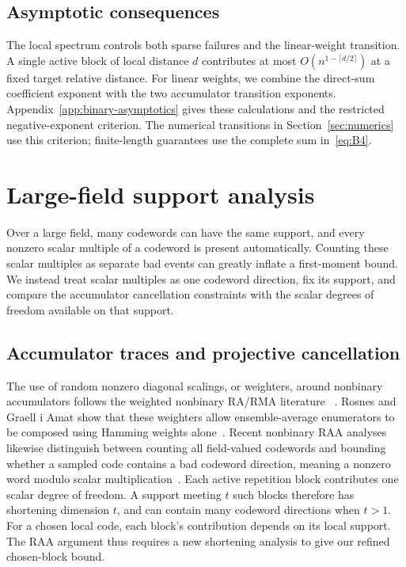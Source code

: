 \documentclass[runningheads,envcountsame,envcountsect]{llncs}
\begin{document}
\subsection{Asymptotic consequences}
The local spectrum controls both sparse failures and the linear-weight
transition.  A single active block of local distance $d$ contributes at most
$O(n^{1-\lceil d/2\rceil})$ at a fixed target relative distance.  For linear
weights, we combine the direct-sum coefficient exponent with the two
accumulator transition exponents.  Appendix~\ref{app:binary-asymptotics}
gives these calculations and the restricted negative-exponent criterion.
The numerical transitions in Section~\ref{sec:numerics} use this criterion;
finite-length guarantees use the complete sum in~\eqref{eq:B4}.

\section{Large-field support analysis}
\label{sec:large-field}

Over a large field, many codewords can have the same support, and every nonzero
scalar multiple of a codeword is present automatically.  Counting these scalar
multiples as separate bad events can greatly inflate a first-moment bound.  We
instead treat scalar multiples as one codeword direction, fix its support, and
compare the accumulator cancellation constraints with the scalar degrees of
freedom available on that support.

\subsection{Accumulator traces and projective cancellation}

The use of random nonzero diagonal scalings, or weighters, around nonbinary
accumulators follows the weighted nonbinary RA/RMA literature
~\cite{yang04,rosnes11}.  Rosnes and Graell i Amat show that these weighters
allow ensemble-average enumerators to be composed using Hamming weights
alone~\cite[Theorem~1]{rosnes11}.  Recent nonbinary RAA analyses likewise distinguish
between counting all field-valued codewords and bounding whether a sampled code
contains a bad codeword direction, meaning a nonzero word modulo scalar
multiplication~\cite{akhiani26,khabbazian26,blindraa26}.  Each active repetition
block contributes one scalar degree of freedom.  A support meeting $t$ such
blocks therefore has shortening dimension $t$, and can contain many codeword
directions when $t>1$.  For a chosen local code, each block's contribution
depends on its local support.  The RAA argument thus requires a new shortening
analysis to give our refined chosen-block bound.
\end{document}
